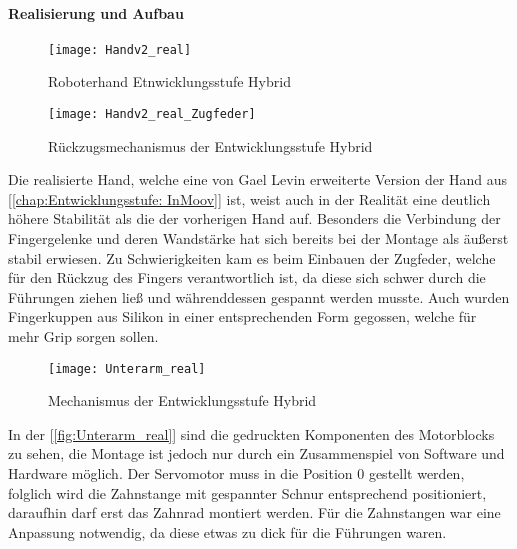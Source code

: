 \documentclass[titlepage,12pt,twoside]{article}
\begin{document}
\paragraph{Realisierung und Aufbau}
\hfill \break
\hfill \break
\begin{figure}[H]
	\begin{center}
		\scalebox{0.5}
		{\texttt{[image: Handv2\_real]}}
		\caption{Roboterhand Etnwicklungsstufe Hybrid}
		\label{fig:Handv2_real}			
	\end{center}
\end{figure}
\begin{figure}[H]
	\begin{center}
		\scalebox{0.5}
		{\texttt{[image: Handv2\_real\_Zugfeder]}}
		\caption{Rückzugsmechanismus der Entwicklungsstufe Hybrid}
		\label{fig:Handv2_real_Zugfeder}			
	\end{center}
\end{figure}
\hfill \break
Die realisierte Hand, welche eine von Gael Levin erweiterte Version der Hand aus 
[\textcolor{blue}{\autoref{chap:Entwicklungsstufe: InMoov}}] ist, weist auch in der Realität eine 
deutlich höhere Stabilität als die der vorherigen Hand auf. Besonders die 
Verbindung der Fingergelenke und deren Wandstärke hat sich bereits bei der Montage 
als äußerst stabil erwiesen. Zu Schwierigkeiten kam es beim Einbauen der Zugfeder, 
welche für den Rückzug des Fingers verantwortlich ist, da diese sich schwer durch 
die Führungen ziehen ließ und währenddessen gespannt werden musste. Auch wurden 
Fingerkuppen aus Silikon in einer entsprechenden Form gegossen, welche für mehr 
Grip sorgen sollen. \\
\begin{figure}[H]
	\begin{center}
		\scalebox{1}
		{\texttt{[image: Unterarm\_real]}}
		\caption{Mechanismus der Entwicklungsstufe Hybrid}
		\label{fig:Unterarm_real}			
	\end{center}
\end{figure}
\hfill \break
In der [\textcolor{blue}{\autoref{fig:Unterarm_real}}] sind die gedruckten Komponenten des Motorblocks 
zu sehen, die Montage ist jedoch nur durch ein Zusammenspiel von Software und 
Hardware möglich. Der Servomotor muss in die Position 0 gestellt werden, folglich 
wird die Zahnstange mit gespannter Schnur entsprechend positioniert, daraufhin 
darf erst das Zahnrad montiert werden. Für die Zahnstangen war eine Anpassung 
notwendig, da diese etwas zu dick für die Führungen waren. \\
\end{document}
